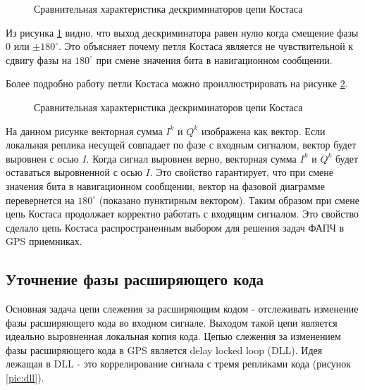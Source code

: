 \begin{figure}[h]
\begin{center}
\end{center}
\caption{Сравнительная характеристика дескриминаторов цепи Костаса}
\label{pic:descriminator}
\end{figure}

Из рисунка \ref{pic:descriminator} видно, что выход дескриминатора равен нулю когда смещение фазы 0 или ${\pm{180}^\circ}$.
Это объясняет почему петля Костаса является не чувствительной к сдвигу фазы на ${180^\circ}$ при смене значения бита
в навигационном сообщении.

Более подробно работу петли Костаса можно проиллюстрировать на рисунке \ref{pic:phasor}. 

\begin{figure}[h]
\begin{center}
\end{center}
\caption{Сравнительная характеристика дескриминаторов цепи Костаса}
\label{pic:phasor}
\end{figure}
На данном рисунке векторная сумма ${I^k}$ и ${Q^k}$ изображена как вектор. Если локальная реплика несущей совпадает по фазе с входным сигналом, вектор будет
выровнен с осью ${I}$. Когда сигнал выровнен верно, векторная сумма ${I^k}$ и ${Q^k}$ будет оставаться выровненной с осью ${I}$.
Это свойство гарантирует, что при смене значения бита в навигационном сообщении, вектор на фазовой диаграмме перевернется на
${180^\circ}$ (показано пунктирным вектором). Таким образом при смене цепь Костаса продолжает корректно работать с входящим сигналом.
Это свойство сделало цепь Костаса распространенным выбором для решения задач ФАПЧ в GPS приемниках.

\subsection{Уточнение фазы расширяющего кода}
Основная задача цепи слежения за расширяющим кодом - отслеживать изменение фазы расширяющего кода во входном
сигнале. Выходом такой цепи является идеально выровненная локальная копия кода. Цепью слежения за изменением
фазы расширяющего кода в GPS является delay locked loop (DLL). Идея лежащая в DLL - это коррелирование
сигнала с тремя репликами кода (рисунок \ref{pic:dll}).


